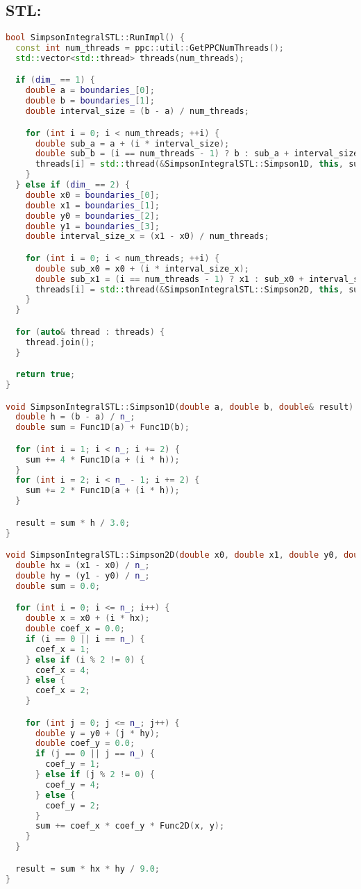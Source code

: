 \documentclass[12pt]{article}
\begin{document}
\subsection*{STL:}
\begin{lstlisting}[language=C++]
bool SimpsonIntegralSTL::RunImpl() {
  const int num_threads = ppc::util::GetPPCNumThreads();
  std::vector<std::thread> threads(num_threads);

  if (dim_ == 1) {
    double a = boundaries_[0];
    double b = boundaries_[1];
    double interval_size = (b - a) / num_threads;

    for (int i = 0; i < num_threads; ++i) {
      double sub_a = a + (i * interval_size);
      double sub_b = (i == num_threads - 1) ? b : sub_a + interval_size;
      threads[i] = std::thread(&SimpsonIntegralSTL::Simpson1D, this, sub_a, sub_b, std::ref(results_[i]));
    }
  } else if (dim_ == 2) {
    double x0 = boundaries_[0];
    double x1 = boundaries_[1];
    double y0 = boundaries_[2];
    double y1 = boundaries_[3];
    double interval_size_x = (x1 - x0) / num_threads;

    for (int i = 0; i < num_threads; ++i) {
      double sub_x0 = x0 + (i * interval_size_x);
      double sub_x1 = (i == num_threads - 1) ? x1 : sub_x0 + interval_size_x;
      threads[i] = std::thread(&SimpsonIntegralSTL::Simpson2D, this, sub_x0, sub_x1, y0, y1, std::ref(results_[i]));
    }
  }

  for (auto& thread : threads) {
    thread.join();
  }

  return true;
}

void SimpsonIntegralSTL::Simpson1D(double a, double b, double& result) const {
  double h = (b - a) / n_;
  double sum = Func1D(a) + Func1D(b);

  for (int i = 1; i < n_; i += 2) {
    sum += 4 * Func1D(a + (i * h));
  }
  for (int i = 2; i < n_ - 1; i += 2) {
    sum += 2 * Func1D(a + (i * h));
  }

  result = sum * h / 3.0;
}

void SimpsonIntegralSTL::Simpson2D(double x0, double x1, double y0, double y1, double& result) const {
  double hx = (x1 - x0) / n_;
  double hy = (y1 - y0) / n_;
  double sum = 0.0;

  for (int i = 0; i <= n_; i++) {
    double x = x0 + (i * hx);
    double coef_x = 0.0;
    if (i == 0 || i == n_) {
      coef_x = 1;
    } else if (i % 2 != 0) {
      coef_x = 4;
    } else {
      coef_x = 2;
    }

    for (int j = 0; j <= n_; j++) {
      double y = y0 + (j * hy);
      double coef_y = 0.0;
      if (j == 0 || j == n_) {
        coef_y = 1;
      } else if (j % 2 != 0) {
        coef_y = 4;
      } else {
        coef_y = 2;
      }
      sum += coef_x * coef_y * Func2D(x, y);
    }
  }

  result = sum * hx * hy / 9.0;
}
\end{lstlisting}
\end{document}
